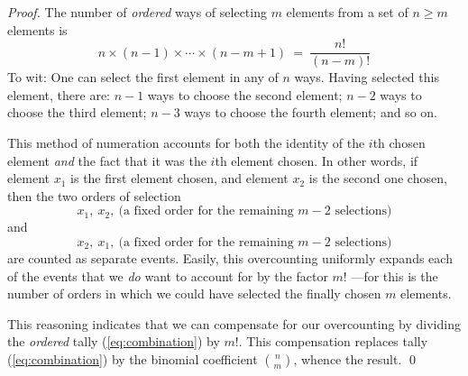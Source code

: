 \begin{proof}
The number of {\em ordered} ways of selecting $m$ elements from a set of $n \geq m$ elements is 
\begin{equation}
\label{eq:combination}
n \times (n-1) \times \cdots \times (n-m+1) \ = \ \frac{n!}{(n-m)!}
\end{equation}
To wit: One can select the first element in any of $n$ ways.  Having selected this element, there are: $n-1$ ways to choose the second element; $n-2$ ways to choose the third element; $n-3$ ways to choose the fourth element; and so on.

\smallskip

This method of numeration accounts for both the identity of the $i$th chosen element  {\em and} the fact that it was the $i$th element chosen.  In other words, if element $x_1$ is the first element chosen, and element $x_2$ is the second one chosen, then the two orders of selection
\[ x_1, \ x_2, \ \mbox{(a fixed order for the remaining $m-2$ selections)} \]
and 
\[ x_2, \ x_1, \ \mbox{(a fixed order for the remaining $m-2$ selections)} \]
are counted as separate events.  Easily, this overcounting uniformly expands each of the events that we {\em do} want to account for by the factor $m!$ ---for this is the number of orders  in which we could have selected the finally chosen $m$ elements.

\smallskip

This reasoning indicates that we can compensate for our overcounting by dividing the  {\em ordered} tally (\ref{eq:combination}) by $m!$.  This compensation replaces tally (\ref{eq:combination}) by the binomial coefficient $\displaystyle {n \choose m}$, whence the result.  \qed
\end{proof}

\bigskip

\noindent {}

